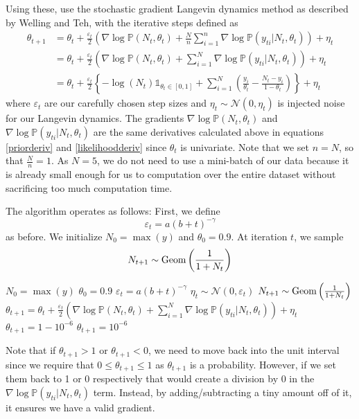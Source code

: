 \documentclass[letterpaper,12pt]{amsart}
\newcommand{\sumin}{\sum_{i=1}^n}
\newcommand{\p}[1]{\mathbb{P}\!\left(#1\right)}
\newcommand{\Geom}{\textnormal{Geom}}
\newcommand{\sN}{\mathcal{N}}
\begin{document}
\begin{enumerate}[1.]
Using these, use the stochastic gradient Langevin dynamics method as described by Welling and Teh, with the iterative steps defined as
\begin{align*}
\theta_{t+1} &= \theta_t + \frac{\varepsilon_t}{2}\left(\nabla \log \p{N_t, \theta_t} + \frac{N}{n} \sumin \nabla \log \p{y_{ti} | N_t, \theta_t} \right) + \eta_t\\
&= \theta_t + \frac{\varepsilon_t}{2}\left(\nabla \log \p{N_t, \theta_t} + \sum_{i=1}^N \nabla \log \p{y_{ti} | N_t, \theta_t} \right) + \eta_t\\
&= \theta_t + \frac{\varepsilon_t}{2}\left\{-\log(N_t)\mathds{1}_{\theta_t \in [0,1]} + \sum_{i=1}^N \left( \frac{y_i}{\theta_t} - \frac{N_t - y_i}{1 - \theta_t} \right) \right\}+ \eta_t
\end{align*}
where $\varepsilon_t$ are our carefully chosen step sizes and $\eta_t \sim \sN(0, \eta_t)$ is injected noise for our Langevin dynamics. The gradients $\nabla \log \p{N_t, \theta_t}$ and $ \nabla \log \p{y_{ti} | N_t, \theta_t}$ are the same derivatives calculated above in equations \eqref{priorderiv} and \eqref{likelihoodderiv} since $\theta_t$ is univariate. Note that we set $n=N$, so that $\frac{N}{n}=1$. As $N=5$, we do not need to use a mini-batch of our data because it is already small enough for us to computation over the entire dataset without sacrificing too much computation time.

The algorithm operates as follows: First, we define
\[\varepsilon_t = a(b + t)^{-\gamma}\]
as before. We initialize $N_0=\max(y)$ and $\theta_0=0.9$. At iteration $t$, we sample
\[N_{t+1} \sim \Geom\left(\frac{1}{1+N_t}\right)\]

\begin{framed}
\begin{algorithmic}
\State $N_0 = \max(y)$
\State $\theta_0 = 0.9$
\State $\varepsilon_t = a(b+t)^{-\gamma}$
\State $\eta_t \sim \sN(0, \varepsilon_t)$
\State $N_{t+1} \sim \Geom\left(\frac{1}{1 + N_t}\right)$
\State $\theta_{t+1} = \theta_t + \frac{\varepsilon_t}{2}\left(\nabla \log \p{N_t, \theta_t} + \sum_{i=1}^N \nabla \log \p{y_{ti} | N_t, \theta_t}\right) + \eta_t$
\State $\theta_{t+1} = 1 - 10^{-6}$
\EndIf
{}
\State $\theta_{t+1} = 10^{-6}$
\EndIf
\EndFor
\end{algorithmic}
\end{framed}

Note that if $\theta_{t+1} > 1$ or $\theta_{t+1} < 0$, we need to move back into the unit interval since we require that $0 \leq \theta_{t+1} \leq 1$ as $\theta_{t+1}$ is a probability. However, if we set them back to 1 or 0 respectively that would create a division by 0 in the $\nabla \log \p{y_{ti} | N_t, \theta_t}$ term. Instead, by adding/subtracting a tiny amount off of it, it ensures we have a valid gradient.


\end{enumerate}
\end{document}
